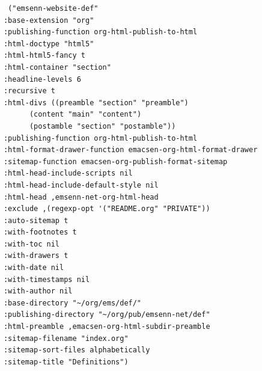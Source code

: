 \documentclass[11pt]{article}
\begin{document}
\begin{verbatim}
	   ("emsenn-website-def"
	  :base-extension "org"
	  :publishing-function org-html-publish-to-html
	  :html-doctype "html5"
	  :html-html5-fancy t
	  :html-container "section"
	  :headline-levels 6
	  :recursive t
	  :html-divs ((preamble "section" "preamble")
		    (content "main" "content")
		    (postamble "section" "postamble"))
	  :publishing-function org-html-publish-to-html
	  :html-format-drawer-function emacsen-org-html-format-drawer
	  :sitemap-function emacsen-org-publish-format-sitemap
	  :html-head-include-scripts nil
	  :html-head-include-default-style nil
	  :html-head ,emsenn-net-org-html-head
	  :exclude ,(regexp-opt '("README.org" "PRIVATE"))
	  :auto-sitemap t
	  :with-footnotes t
	  :with-toc nil
	  :with-drawers t
	  :with-date nil
	  :with-timestamps nil
	  :with-author nil
	  :base-directory "~/org/ems/def/"
	  :publishing-directory "~/org/pub/emsenn-net/def"
	  :html-preamble ,emacsen-org-html-subdir-preamble
	  :sitemap-filename "index.org"
	  :sitemap-sort-files alphabetically
	  :sitemap-title "Definitions")


\end{verbatim}
\end{document}
